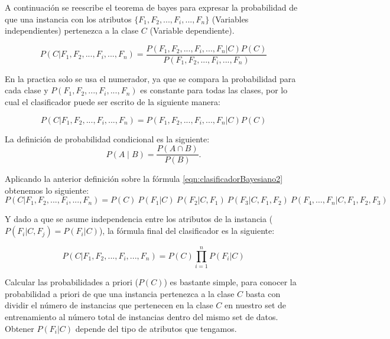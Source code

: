 \documentclass[11pt,fleqn]{book} %
\begin{document}
A continuación se reescribe el teorema de bayes para expresar la probabilidad de que una instancia con los atributos $\{F_{1},F_{2},...,F_{i},...,F_{n}\}$ (Variables independientes) pertenezca a la clase $C$ (Variable dependiente).

\begin{equation}
P(C|F_{1},F_{2},...,F_{i},...,F_{n}) = \frac{P(F_{1},F_{2},...,F_{i},...,F_{n}|C) P(C)}{P(F_{1},F_{2},...,F_{i},...,F_{n})}
\label{eqn:clasificadorBayesiano1} 
\end{equation}

En la practica solo se usa el numerador, ya que se compara la probabilidad para cada clase y $P(F_{1},F_{2},...,F_{i},...,F_{n})$ es constante para todas las clases, por lo cual el clasificador puede ser escrito de la siguiente manera:

\begin{equation}
P(C|F_{1},F_{2},...,F_{i},...,F_{n}) = P(F_{1},F_{2},...,F_{i},...,F_{n}|C) P(C)
\label{eqn:clasificadorBayesiano2} 
\end{equation}

La definición de probabilidad condicional es la siguiente:
\begin{equation}
P(A \mid B) = \frac{P(A \cap B)}{P(B)}.
\label{eqn:probabilidadCondicional} 
\end{equation}

Aplicando la anterior definición sobre la fórmula \ref{eqn:clasificadorBayesiano2} obtenemos lo siguiente:
\begin{equation}
P(C|F_{1},F_{2},...,F_{i},...,F_{n}) = P(C) \ P(F_1\vert C) \ P(F_2\vert C, F_1) \ P(F_3\vert C, F_1, F_2) \ P(F_4,\dots,F_n\vert C, F_1, F_2, F_3)
\label{eqn:clasificadorBayesiano3} 
\end{equation}

Y dado a que se asume independencia entre los atributos de la instancia ($P(F_{i}\vert C,F_{j})=P(F_{i}\vert C)$), la fórmula final del clasificador es la siguiente:

\begin{equation}
P(C|F_{1},F_{2},...,F_{i},...,F_{n}) = P(C) \prod_{i=1}^n P(F_i \vert C)
\label{eqn:clasificadorBayesianoFinal} 
\end{equation}

Calcular las probabilidades a priori ($P(C)$) es bastante simple, para conocer la probabilidad a priori de que una instancia pertenezca a la clase $C$ basta con dividir el número de instancias que pertenecen en la clase $C$ en nuestro set de entrenamiento al número total de instancias dentro del mismo set de datos. Obtener $P(F_i \vert C)$ depende del tipo de atributos que tengamos.
\end{document}

